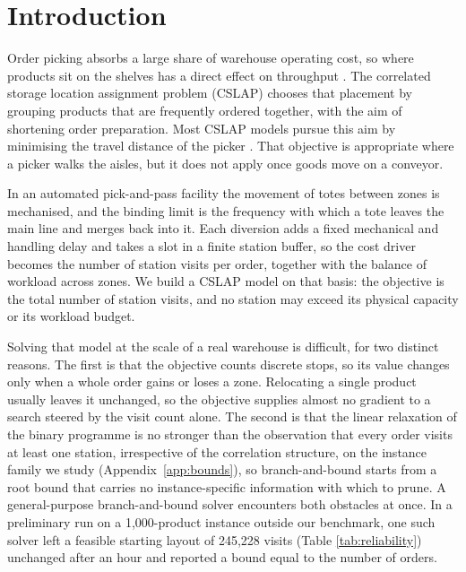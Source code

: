 \documentclass[]{interact}
\begin{document}
\section{Introduction}
Order picking absorbs a large share of warehouse operating cost, so where products sit on the shelves has a direct effect on throughput \citep{xie2024combi}. The correlated storage location assignment problem (CSLAP) chooses that placement by grouping products that are frequently ordered together, with the aim of shortening order preparation. Most CSLAP models pursue this aim by minimising the travel distance of the picker \citep{islam2023}. That objective is appropriate where a picker walks the aisles, but it does not apply once goods move on a conveyor.

In an automated pick-and-pass facility the movement of totes between zones is mechanised, and the binding limit is the frequency with which a tote leaves the main line and merges back into it. Each diversion adds a fixed mechanical and handling delay and takes a slot in a finite station buffer, so the cost driver becomes the number of station visits per order, together with the balance of workload across zones. We build a CSLAP model on that basis: the objective is the total number of station visits, and no station may exceed its physical capacity or its workload budget.

Solving that model at the scale of a real warehouse is difficult, for two distinct reasons. The first is that the objective counts discrete stops, so its value changes only when a whole order gains or loses a zone. Relocating a single product usually leaves it unchanged, so the objective supplies almost no gradient to a search steered by the visit count alone. The second is that the linear relaxation of the binary programme is no stronger than the observation that every order visits at least one station, irrespective of the correlation structure, on the instance family we study (Appendix~\ref{app:bounds}), so branch-and-bound starts from a root bound that carries no instance-specific information with which to prune. A general-purpose branch-and-bound solver encounters both obstacles at once. In a preliminary run on a 1,000-product instance outside our benchmark, one such solver left a feasible starting layout of 245,228 visits (Table \ref{tab:reliability}) unchanged after an hour and reported a bound equal to the number of orders.
\end{document}
